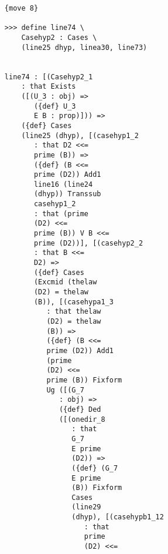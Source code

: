 \documentclass[12pt]{article}
\begin{document}
\begin{verbatim}
                        {move 8}

                        >>> define line74 \
                            Casehyp2 : Cases \
                            (line25 dhyp, linea30, line73)


                        line74 : [(Casehyp2_1 
                            : that Exists 
                            ([(U_3 : obj) => 
                               ({def} U_3 
                               E B : prop)])) => 
                            ({def} Cases 
                            (line25 (dhyp), [(casehyp1_2 
                               : that D2 <<= 
                               prime (B)) => 
                               ({def} (B <<= 
                               prime (D2)) Add1 
                               line16 (line24 
                               (dhyp)) Transsub 
                               casehyp1_2 
                               : that (prime 
                               (D2) <<= 
                               prime (B)) V B <<= 
                               prime (D2))], [(casehyp2_2 
                               : that B <<= 
                               D2) => 
                               ({def} Cases 
                               (Excmid (thelaw 
                               (D2) = thelaw 
                               (B)), [(casehypa1_3 
                                  : that thelaw 
                                  (D2) = thelaw 
                                  (B)) => 
                                  ({def} (B <<= 
                                  prime (D2)) Add1 
                                  (prime 
                                  (D2) <<= 
                                  prime (B)) Fixform 
                                  Ug ([(G_7 
                                     : obj) => 
                                     ({def} Ded 
                                     ([(onedir_8 
                                        : that 
                                        G_7 
                                        E prime 
                                        (D2)) => 
                                        ({def} (G_7 
                                        E prime 
                                        (B)) Fixform 
                                        Cases 
                                        (line29 
                                        (dhyp), [(casehypb1_12 
                                           : that 
                                           prime 
                                           (D2) <<= 

\end{verbatim}
\end{document}
